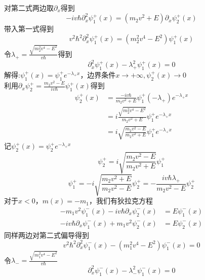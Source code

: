 \documentclass{article}
\numberwithin{equation}{subsection}
\begin{document}
对第二式两边取$\partial_x$得到
\begin{equation}
    -iv\hbar\partial_x^2\psi_1^+(x)=(m_2v^2+E)\partial_x\psi_2^+(x)
\end{equation}
带入第一式得到
\begin{equation}
    v^2\hbar^2\partial_x^2\psi_1^+(x)=(m_2^2v^4-E^2)\psi_1^+(x)
\end{equation}
令$\lambda_+=\frac{\sqrt{m_2^2v^4-E^2}}{v\hbar}$得到
\begin{equation}
    \partial_x^2\psi_1^+(x)-\lambda_+^2\psi_1^+(x)=0
\end{equation}
解得:$\psi_1^+(x)=\psi_1^+e^{-\lambda_+x}$，边界条件$x\to+\infty,\psi_2^+(x)\to0$\\
利用$\partial_x\psi_2^+=\frac{m_2v^2-E}{iv\hbar}\psi_1^+(x)$得到
\begin{equation}
    \begin{split}
        \psi_2^+(x)&=\frac{-iv\hbar}{m_2v^2+E}\psi_1^+(-\lambda_+)e^{-\lambda_+x}\\
        &=i\frac{\sqrt{m_2^2v^4-E^2}}{m_2v^2+E}\psi_1^+e^{-\lambda_+x}\\
        &=i\sqrt{\frac{m_2v^2-E}{m_2v^2+E}}\psi_1^+e^{-\lambda_+x}
    \end{split}
\end{equation}
记$\psi_2^+(x)=\psi_2^+e^{-\lambda_+x}$
\begin{equation}
    \psi_2^+=i\sqrt{\frac{m_2v^2-E}{m_2v^2+E}}\psi_1^+
\end{equation}
\begin{equation}
    \psi_1^+=-i\sqrt{\frac{m_2v^2+E}{m_2v^2-E}}\psi_2^+=-\frac{iv\hbar\lambda_+}{m_2v^2-E}\psi_2^+
\end{equation}
对于$x<0$，$m(x)=-m_1$，我们有狄拉克方程
\begin{equation}
    \begin{split}
        -m_1v^2\psi_1^-(x)-iv\hbar\partial_x\psi_2^-(x)&=E\psi_1^-(x)\\
        -iv\hbar\partial_x\psi_1^-(x)+m_1v^2\psi_2^-(x)&=E\psi_2^-(x)
    \end{split}
\end{equation}
同样两边对第二式偏导得到
\begin{equation}
    v^2\hbar^2\partial_x^2\psi_1^-(x)-(m_1^2v^4-E^2)\psi_1^-(x)=0
\end{equation}
令$\lambda_-=\frac{\sqrt{m_1^2v^4-E^2}}{v\hbar}$
\begin{equation}
    \partial_x^2\psi_1^-(x)-\lambda_-^2\psi_1^-(x)=0
\end{equation}
\end{document}
